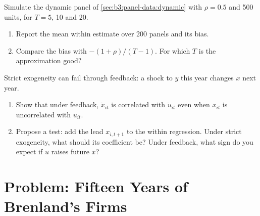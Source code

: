 \begin{exercise}[$\star\star\star$]\label{exo:b3:panel-data:11}
Simulate the dynamic panel of \cref{sec:b3:panel-data:dynamic} with $\rho = 0.5$
and 500 units, for $T = 5$, 10 and 20.
\begin{enumerate}
\item Report the mean within estimate over 200 panels and its bias.
\item Compare the bias with $-(1 + \rho)/(T - 1)$. For which $T$ is the
approximation good?
\end{enumerate}
\end{exercise}

\begin{exercise}[$\star\star\star$]\label{exo:b3:panel-data:12}
Strict exogeneity can fail through feedback: a shock to $y$ this year changes
$x$ next year.
\begin{enumerate}
\item Show that under feedback, $\ddot x_{it}$ is correlated with $\ddot u_{it}$
even when $x_{it}$ is uncorrelated with $u_{it}$.
\item Propose a test: add the lead $x_{i,t+1}$ to the within regression. Under
strict exogeneity, what should its coefficient be? Under feedback, what sign do
you expect if $u$ raises future $x$?
\end{enumerate}
\end{exercise}

\section{Problem: Fifteen Years of Brenland's Firms}\label{sec:b3:panel-data:problem}

